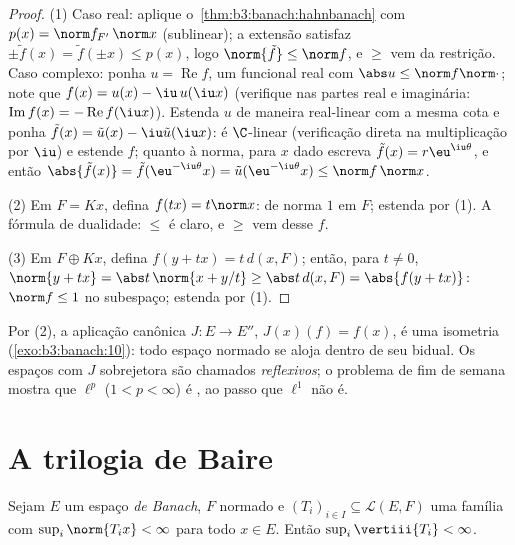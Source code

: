 \begin{proof}
(1) Caso real: aplique o~\cref{thm:b3:banach:hahnbanach} com $p(x)
= \norm f_{F'}\,\norm x$ (sublinear); a
extensão satisfaz $\pm\tilde f(x) = \tilde f(\pm x) \leq p(x)$, logo $\norm{\tilde f} \leq \norm f$, e $\geq$ vem da restrição. Caso
complexo: ponha $u = \operatorname{Re}f$, um funcional real com $\abs u \leq \norm f\norm\cdot$; note que $f(x) = u(x) -
\iu\,u(\iu x)$
(verifique nas partes real e imaginária: $\operatorname{Im}f(x) = -\operatorname{Re}f(\iu x)$). Estenda $u$ de
maneira real-linear com a mesma cota e ponha $\tilde f(x) =
\tilde u(x) - \iu\tilde u(\iu x)$: é $\C$-linear
(verificação direta na multiplicação por $\iu$) e estende $f$;
quanto à norma, para $x$ dado escreva $\tilde f(x) = r\eu^{\iu\theta}$, e então $\abs{\tilde f(x)}
= \tilde f(\eu^{-\iu\theta}x) = \tilde u(\eu^{-\iu\theta}x)
\leq \norm f\,\norm x$.

(2) Em $F = Kx$, defina $f(tx) = t\norm x$: de norma $1$ em $F$; estenda
por (1). A fórmula de dualidade: $\leq$ é claro, e $\geq$ vem
desse $f$.

(3) Em $F \oplus Kx$, defina $f(y + tx) = t\,d(x, F)$; então, para $t \neq 0$, $\norm{y + tx} = \abs t\,\norm{x + y/t} \geq \abs
t\,d(x, F) = \abs{f(y + tx)}$: $\norm f \leq 1$ no
subespaço; estenda por (1).
\end{proof}

\begin{remark}\label{rem:b3:banach:bidual}
Por (2), a aplicação canônica $J \colon E \to E''$, $J(x)(f) =
f(x)$, é uma isometria
(\cref{exo:b3:banach:10}): todo espaço normado se aloja dentro de seu bidual. Os
espaços com $J$ sobrejetora são chamados
\emph{reflexivos}; o problema de fim de semana
mostra que $\ell^p$ ($1 < p < \infty$) é , ao passo que $\ell^1$
não é.
\end{remark}

\section{A trilogia de Baire}

\begin{theorem}
\label{thm:b3:banach:banachsteinhaus}
Sejam $E$ um espaço \emph{de Banach}, $F$ normado e $(T_i)_{i\in
I} \subseteq \mathcal L(E, F)$ uma
família com $\sup_i
\norm{T_ix} < \infty$ para todo $x \in E$. Então $\sup_i
\vertiii{T_i} < \infty$.
\end{theorem}


